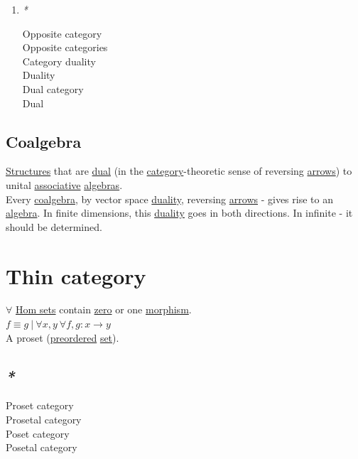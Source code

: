 \documentclass[a4paper,14pt,oneside]{book}
\begin{document}
\begin{enumerate}
\item \emph{*}
\label{sec:org2e26590}

\label{orgae0b8cd}Opposite category\\
\label{orgd04db69}Opposite categories\\
\label{org10da51f}Category duality\\
\label{orgb720680}Duality\\
\label{org63fbdbf}Dual category\\
\label{org4214c76}Dual\\
\end{enumerate}

\subsection{\label{orgca879f8}Coalgebra}
\label{sec:org6032382}
\hyperref[orgcf18e73]{Structures} that are \hyperref[org4214c76]{dual} (in the \hyperref[orgc2c97e7]{category}-theoretic sense of reversing \hyperref[orge3fa7c8]{arrows}) to unital \hyperref[org5fe1690]{associative} \hyperref[orgeb39656]{algebras}.\\
Every \hyperref[orgca879f8]{coalgebra}, by vector space \hyperref[orgb720680]{duality}, reversing \hyperref[orge3fa7c8]{arrows} - gives rise to an \hyperref[org682b81e]{algebra}. In finite dimensions, this \hyperref[orgb720680]{duality} goes in both directions. In infinite - it should be determined.\\

\section{\label{org45fcdbb}Thin category}
\label{sec:org2dbab8d}
\(\forall\) \hyperref[orgba9ed30]{Hom sets} contain \hyperref[org9629e67]{zero} or one \hyperref[org5a7c2d8]{morphism}.\\

\(f \equiv g \ | \ \forall x,y \ \forall f,g: x \to y\)\\

A proset (\hyperref[org8da1c0b]{preordered} \hyperref[org0f7f8fa]{set}).\\

\subsection{\emph{*}}
\label{sec:org4e2387f}

\label{org4c161ed}Proset category\\
\label{org91fef01}Prosetal category\\
\label{orgf84680b}Poset category\\
\label{org13ee5bb}Posetal category\\
\end{document}
